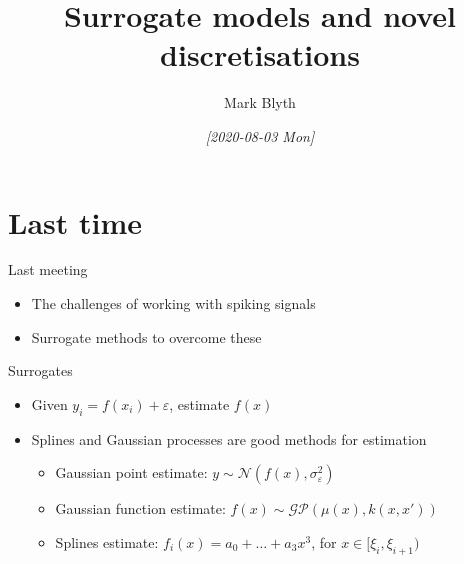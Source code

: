 \documentclass[presentation]{beamer}
\author{Mark Blyth}
\date{\textit{[2020-08-03 Mon]}}
\title{Surrogate models and novel discretisations}
\begin{document}
\maketitle

\section{Last time}
\label{sec:org06928a5}
\begin{frame}[label={sec:org549a639}]{Last meeting}
\begin{itemize}
\item The challenges of working with spiking signals
\end{itemize}
\vfill
\begin{itemize}
\item Surrogate methods to overcome these
\end{itemize}
\end{frame}

\begin{frame}[label={sec:org7942ec0}]{Surrogates}
\begin{itemize}
\item Given \(y_i = f(x_i) + \varepsilon\), estimate \(f(x)\)
\end{itemize}
\vfill
\begin{itemize}[<+->]
\item Splines and Gaussian processes are good methods for estimation
\begin{itemize}
\item Gaussian point estimate: \(y \sim \mathcal{N}(f(x), \sigma^2_\varepsilon)\)
\item Gaussian function estimate: \(f(x) \sim \mathcal{GP}(\mu(x), k(x, x'))\)
\item Splines estimate: \(f_i(x) = a_0 + \dots + a_3x^3\), for \(x\in[\xi_i, \xi_{i+1})\)
\end{itemize}
\end{itemize}
\end{frame}
\end{document}
